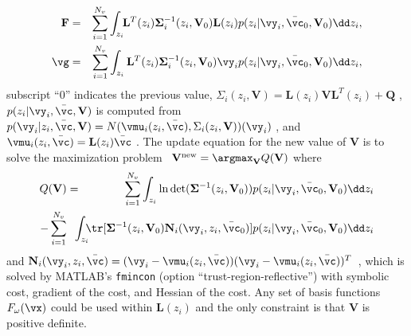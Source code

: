 \begin{eqnarray}
\mathbf{F}
&=&
\sum_{i=1}^{N_v}
\int_{z_i}
\!\!
\mathbf{L}^T(z_i)
\mathbf{\Sigma}_i^{-1}(z_i,\mathbf{V}_0)
\mathbf{L}(z_i)
p(z_i|\vy_i,\bar{\vc}_0,\mathbf{V}_0)
\dd z_i
\label{eq:F:def}
,
\\
\vg
&=&
\sum_{i=1}^{N_v}
\int_{z_i}
\mathbf{L}^T(z_i)
\mathbf{\Sigma}_i^{-1}(z_i,\mathbf{V}_0)
\vy_i
p(z_i|\vy_i,\bar{\vc}_0,\mathbf{V}_0)
\dd z_i
\label{eq:g:def}
,
\end{eqnarray}
subscript ``0'' indicates the previous value,
$\Sigma_i(z_i,\mathbf{V})
=
\mathbf{L}(z_i) \mathbf{V} \mathbf{L}^T(z_i) + \mathbf{Q}$
\cite[Eq.~7]{YiliZhengQiuWangDoerschukJOSA2012},
$p(z_i|\vy_i,\bar{\vc},\mathbf{V})$ is computed from
$p(\vy_i|z_i,\bar{\vc},\mathbf{V})
=
N(\vmu_i(z_i,\bar{\vc}),\Sigma_i(z_i,\mathbf{V}))(\vy_i)
$
\cite[Eq.~8]{YiliZhengQiuWangDoerschukJOSA2012},
and
$\vmu_i(z_i,\bar{\vc})=\mathbf{L}(z_i)\bar{\vc}$
\cite[Eq.~5]{YiliZhengQiuWangDoerschukJOSA2012}.
The update equation for the new value of $\mathbf{V}$ is to solve the
maximization problem~\cite[Eq.~35]{YiliZhengQiuWangDoerschukJOSA2012}
$\mathbf{V}^{\rm new}=\argmax_{\mathbf{V}} Q(\mathbf{V})$ where
\begin{eqnarray}
Q(\mathbf{V})
&=&
\sum_{i=1}^{N_v}
\int_{z_i}
\ln
\det(
\mathbf{\Sigma}^{-1}(z_i,\mathbf{V}_0)
)
p(z_i|\vy_i,\bar{\vc}_0,\mathbf{V}_0)
\dd z_i
\nonumber\\
-
\sum_{i=1}^{N_v}
&& \!\!\!\!\!\!\!\!
\int_{z_i}
\!\!\!
\tr[
\mathbf{\Sigma}^{-1}(z_i,\mathbf{V}_0)
\mathbf{N}_i(\vy_i,z_i,\bar{\vc}_0)
]
p(z_i|\vy_i,\bar{\vc}_0,\mathbf{V}_0)
\dd z_i
\label{eq:QforVoptimization:def}
\end{eqnarray}
and
$\mathbf{N}_i(\vy_i,z_i,\bar{\vc})=(\vy_i-\vmu_i(z_i,\bar{\vc}))
(\vy_i-\vmu_i(z_i,\bar{\vc}))^T$~\cite[Eq.~34]{YiliZhengQiuWangDoerschukJOSA2012},
which is solved by
MATLAB's {\tt fmincon} (option ``trust-region-reflective'') with symbolic
cost, gradient of the cost, and Hessian of the cost.
Any set of basis functions $F_\omega(\vx)$ could be used within
$\mathbf{L}(z_i)$ and the only constraint is that $\mathbf{V}$ is positive
definite.
